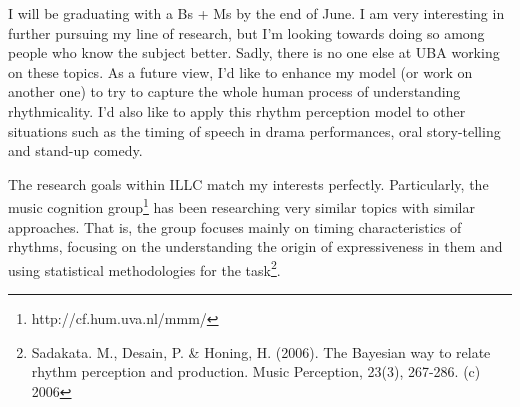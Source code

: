 \documentclass[a4paper]{letter}
\begin{document}
\begin{letter}{}


I will be graduating with a Bs + Ms by the end of June. I am very interesting
in further pursuing my line of research, but I'm looking towards doing so among
people who know the subject better. Sadly, there is no one else at UBA working
on these topics. As a future view, I'd like to enhance my model (or work on
another one) to try to capture the whole human process of understanding
rhythmicality. I'd also like to apply this rhythm perception model to other
situations such as the timing of speech in drama performances, oral
story-telling and stand-up comedy.

The research goals within ILLC match my interests perfectly. Particularly, the
music cognition group\footnote{http://cf.hum.uva.nl/mmm/} has been researching
very similar topics with similar approaches. That is, the group focuses mainly
on timing characteristics of rhythms, focusing on the understanding the origin
of expressiveness in them and using statistical methodologies for the
task\footnote{Sadakata. M., Desain, P. \& Honing, H. (2006). The Bayesian way
to relate rhythm perception and production. Music Perception, 23(3), 267-286.
(c) 2006}.


\end{letter}
\end{document}
